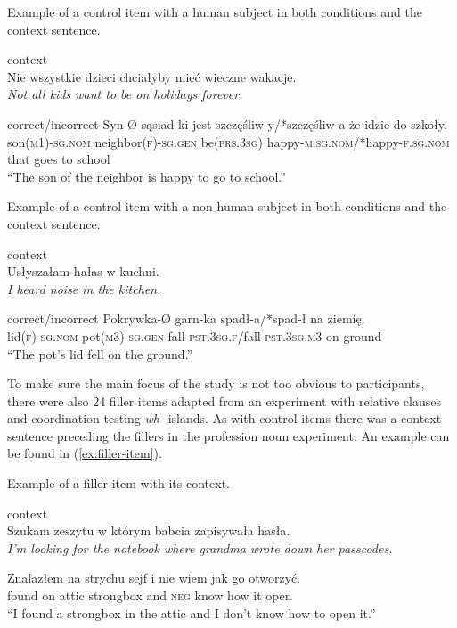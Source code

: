 \begin{exe}
  \ex\label{ex:control-item-hum} Example of a control item with a human subject in both conditions and the context sentence.
  \begin{xlist}
    \ex context\\
    Nie wszystkie dzieci chciałyby mieć wieczne wakacje.\\
    \textsl{Not all kids want to be on holidays forever.}

    \ex correct/incorrect
    \gll Syn-Ø sąsiad-ki jest szczęśliw-y/*szczęśliw-a że idzie do szkoły.\\
    son\textsc{(m1)-sg.nom} neighbor\textsc{(f)-sg.gen} be\textsc{(prs.3sg)} happy\textsc{-m.sg.nom}/*happy\textsc{-f.sg.nom} that goes to school\\
    \glt ``The son of the neighbor is happy to go to school.''\\
  \end{xlist}
\end{exe}

\begin{exe}
  \ex\label{ex:control-item-nonhum} Example of a control item with a non-human subject in both conditions and the context sentence.
  \begin{xlist}
    \ex context\\
    Usłyszałam hałas w kuchni.\\
    \textsl{I heard noise in the kitchen.}

    \ex correct/incorrect
    \gll Pokrywka-Ø garn-ka spadł-a/*spad-ł na ziemię.\\
    lid\textsc{(f)-sg.nom} pot\textsc{(m3)-sg.gen} fall\textsc{-pst.3sg.f}/fall\textsc{-pst.3sg.m3} on ground\\
    \glt ``The pot's lid fell on the ground.''\\
  \end{xlist}
\end{exe}

To make sure the main focus of the study is not too obvious to participants, there were also 24 filler items adapted from an experiment with relative clauses and coordination testing \textsl{wh-} islands. As with control items there was a context sentence preceding the fillers in the profession noun experiment. An example can be found in (\ref{ex:filler-item}).

\begin{exe}
  \ex\label{ex:filler-item} Example of a filler item with its context.
  \begin{xlist}
    \ex context\\
    Szukam zeszytu w którym babcia zapisywała hasła.\\
    \textsl{I'm looking for the notebook where grandma wrote down her passcodes.}

    \ex 
    \gll Znalazłem na strychu sejf i nie wiem jak go otworzyć.\\
    found on attic strongbox and \textsc{neg} know how it open\\
    \glt ``I found a strongbox in the attic and I don't know how to open it.''\\
  \end{xlist}
\end{exe}


